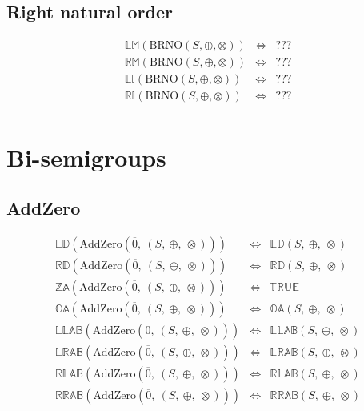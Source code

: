 \documentclass[10pt]{report}
\newcommand{\propname}[1]{{\mathbb{#1}}}
\begin{document}
\subsection{Right natural order}

\[
\begin{array}{rcl} 
\propname{LM}(\mathrm{BRNO}(S,\oplus,\otimes))
    & \Leftrightarrow %
    & ??? \\
\propname{RM}(\mathrm{BRNO}(S,\oplus,\otimes))
    & \Leftrightarrow %
    & ??? \\
\propname{LI}(\mathrm{BRNO}(S,\oplus,\otimes))
    & \Leftrightarrow %
    & ??? \\ 
\propname{RI}(\mathrm{BRNO}(S,\oplus,\otimes))
    & \Leftrightarrow %
    & ??? \\
\end{array} 
\] 


\section{Bi-semigroups}

\subsection{AddZero} 

\[
\begin{array}{rcl} 
\propname{LD}(\mathrm{AddZero}(\overline{0},\ (S,\ \oplus,\ \otimes))) 
    & \Leftrightarrow %
    & \propname{LD}(S,\ \oplus,\ \otimes) \\
\propname{RD}(\mathrm{AddZero}(\overline{0},\ (S,\ \oplus,\ \otimes))) 
    & \Leftrightarrow %
    & \propname{RD}(S,\ \oplus,\ \otimes) \\
\propname{ZA}(\mathrm{AddZero}(\overline{0},\ (S,\ \oplus,\ \otimes))) 
    & \Leftrightarrow %
    & \propname{TRUE}\\ 
\propname{OA}(\mathrm{AddZero}(\overline{0},\ (S,\ \oplus,\ \otimes))) 
    & \Leftrightarrow %
    & \propname{OA}(S,\ \oplus,\ \otimes) \\
\propname{LLAB}(\mathrm{AddZero}(\overline{0},\ (S,\ \oplus,\ \otimes))) 
    & \Leftrightarrow %
    & \propname{LLAB}(S,\ \oplus,\ \otimes)\\
\propname{LRAB}(\mathrm{AddZero}(\overline{0},\ (S,\ \oplus,\ \otimes))) 
    & \Leftrightarrow %
    & \propname{LRAB}(S,\ \oplus,\ \otimes)\\ 
\propname{RLAB}(\mathrm{AddZero}(\overline{0},\ (S,\ \oplus,\ \otimes))) 
    & \Leftrightarrow %
    & \propname{RLAB}(S,\ \oplus,\ \otimes)\\ 
\propname{RRAB}(\mathrm{AddZero}(\overline{0},\ (S,\ \oplus,\ \otimes))) 
    & \Leftrightarrow %
    & \propname{RRAB}(S,\ \oplus,\ \otimes)\\ 

\end{array} 
\] 
\end{document}
